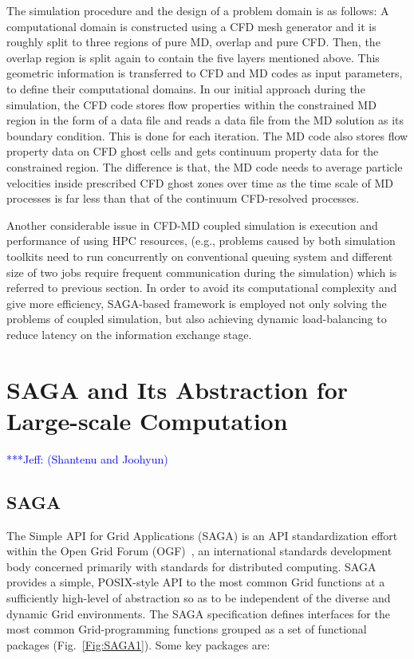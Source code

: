 \documentclass[conference,final]{IEEEtran}
\newcommand{\Nkimnote}[1]{ {\textcolor{green} { ***Nkim: #1 }}}
\newcommand{\skonote}[1]{ {\textcolor{blue} { ***Jeff: #1 }}}
\newcommand{\Nkimnote}[1]{}
\newcommand{\skonote}[1]{}
\begin{document}
The simulation procedure and the design of a problem domain is as follows: A computational domain is constructed using a CFD mesh generator and it is roughly split to three regions of pure MD, overlap and pure CFD. Then, the overlap region is split again to contain the five layers mentioned above. This geometric information is transferred to CFD and MD codes as input parameters, to define their computational domains. In our initial approach during the simulation, the CFD code stores flow properties within the constrained MD region in the form of a data file and reads a data file from the MD solution as its boundary condition. This is done for each iteration. The MD code also stores flow property data on CFD ghost cells and gets continuum property data for the constrained region. The difference is that, the MD code needs to average particle velocities inside prescribed CFD ghost zones over time as the time scale of MD processes is far less than that of the continuum CFD-resolved processes. 

Another considerable issue in CFD-MD coupled simulation is execution and performance of using HPC resources, (e.g., problems caused by both simulation toolkits need to run concurrently on conventional queuing system and different size of two jobs require frequent communication during the simulation) which is referred to previous section. In order to avoid its computational complexity and give more efficiency, SAGA-based framework is employed not only solving the problems of coupled simulation, but also achieving dynamic load-balancing to reduce latency on the information exchange stage. 
 

\section{SAGA and Its Abstraction for Large-scale Computation}
\skonote{(Shantenu and Joohyun)}

\subsection{SAGA}

The Simple API for Grid Applications (SAGA) is an API standardization effort within the Open Grid Forum (OGF)~\cite{ogf_web}, an international standards development body concerned primarily with standards for distributed computing.  SAGA provides a simple, POSIX-style API to the most common Grid functions at a sufficiently high-level of abstraction so as to be %
independent of the diverse and dynamic Grid environments. The SAGA specification defines interfaces for the most common Grid-programming functions grouped as a set of functional packages (Fig.~\ref{Fig:SAGA1}).  Some key packages are:
\end{document}
